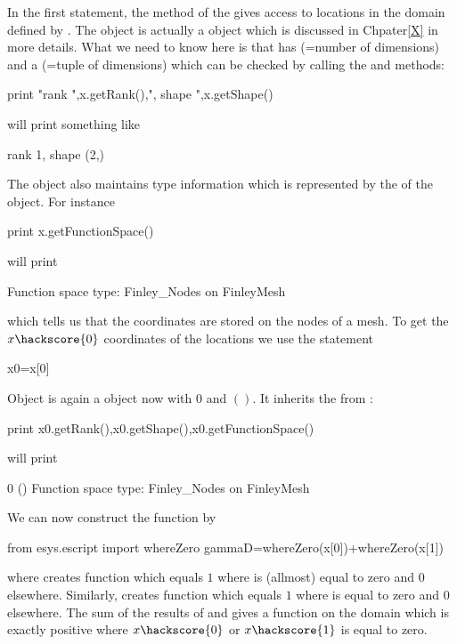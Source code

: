 In the first statement, the method  of the \Domain {} 
gives access to locations 
in the domain defined by . The object  is actually a \Data object which is
discussed in Chpater\ref{X} in more details. What we need to know here is that 
 has \Rank (=number of dimensions) and a \Shape (=tuple of dimensions) which can be checked by 
calling the  and  methods:
\begin{python}
print "rank ",x.getRank(),", shape ",x.getShape()
\end{python}
will print something like
\begin{python}
rank 1, shape (2,)
\end{python}
The \Data object also maintains type information which is represented by the 
\FunctionSpace of the object. For instance
\begin{python}
print x.getFunctionSpace()
\end{python}
will print 
\begin{python}
Function space type: Finley_Nodes on FinleyMesh 
\end{python}
which tells us that the coordinates are stored on the nodes of a \finley mesh. 
To get the  $x\hackscore{0}$ coordinates of the locations we use the
statement 
\begin{python}
x0=x[0]
\end{python}
Object  
is again a \Data object now with \Rank $0$ and 
\Shape $()$. It inherits the \FunctionSpace from :
\begin{python}
print x0.getRank(),x0.getShape(),x0.getFunctionSpace()
\end{python}
will print
\begin{python}
0 () Function space type: Finley_Nodes on FinleyMesh 
\end{python}
We can now construct the function  by
\begin{python}
from esys.escript import whereZero
gammaD=whereZero(x[0])+whereZero(x[1])
\end{python}
where
 creates function which equals $1$ where  is (allmost) equal to zero 
and $0$ elsewhere. 
Similarly,  creates function which equals $1$ where  is 
equal to zero and $0$ elsewhere.
The sum of the results of  and  
gives a function on the domain  which is exactly positive where $x\hackscore{0}$ or $x\hackscore{1}$ is equal to zero.
